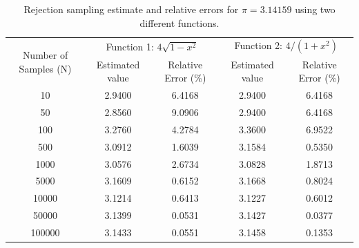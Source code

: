 \documentclass[10pt]{article}
\begin{document}
\begin{table}[htb!]
\centering
\begin{tabular}{|c|c|c|c|c|}
\hline
\multirow{2}{*}{Number of Samples (N)} & \multicolumn{2}{c|}{Function 1: $4\sqrt{1-x^2}$} & \multicolumn{2}{c|}{Function 2: $4/(1+x^2)$} \\ \cline{2-5}
& Estimated value & Relative Error (\%) & Estimated value & Relative Error (\%) \\ \hline
10         & 2.9400 & 6.4168 & 2.9400 & 6.4168 \\ \hline
50         & 2.8560 & 9.0906 & 2.9400 & 6.4168 \\ \hline
100       & 3.2760 & 4.2784 & 3.3600 & 6.9522 \\ \hline
500       & 3.0912 & 1.6039 & 3.1584 & 0.5350 \\ \hline
1000     & 3.0576 & 2.6734 & 3.0828 & 1.8713 \\ \hline
5000     & 3.1609 & 0.6152 & 3.1668 & 0.8024 \\ \hline
10000   & 3.1214 & 0.6413 & 3.1227 & 0.6012 \\ \hline
50000   & 3.1399 & 0.0531 & 3.1427 & 0.0377 \\ \hline
100000 & 3.1433 & 0.0551 & 3.1458 & 0.1353 \\ \hline
\end{tabular}
\caption{Rejection sampling estimate and relative errors for $\pi = 3.14159$ using two different functions.}
\end{table}
\end{document}
